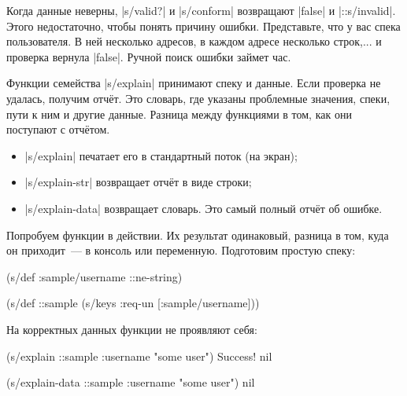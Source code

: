 \label{spec-explain}

Когда данные неверны, \spverb|s/valid?| и \spverb|s/conform| возвращают
\spverb|false| и \spverb|::s/invalid|. Этого недостаточно, чтобы понять причину
ошибки. Представьте, что у вас спека пользователя. В ней несколько адресов, в
каждом адресе несколько строк,... и проверка вернула \spverb|false|. Ручной
поиск ошибки займет час.

Функции семейства \spverb|s/explain| принимают спеку и данные. Если проверка не
удалась, получим отч\"{е}т. Это словарь, где указаны проблемные значения, спеки,
пути к ним и другие данные. Разница между функциями в том, как они поступают с
отч\"{е}том.

\begin{itemize}


\item
  \spverb|s/explain| печатает его в стандартный поток (на экран);

\item
  \spverb|s/explain-str| возвращает отч\"{е}т в виде строки;

\item
  \spverb|s/explain-data| возвращает словарь. Это самый полный отч\"{е}т об ошибке.

\end{itemize}

Попробуем функции в действии. Их результат одинаковый, разница в том, куда он
приходит~--- в консоль или переменную. Подготовим простую спеку:

\begin{english}
  \begin{clojure}
(s/def :sample/username ::ne-string)

(s/def ::sample
  (s/keys :req-un [:sample/username]))
  \end{clojure}
\end{english}

\noindent
На корректных данных функции не проявляют себя:

\begin{english}
  \begin{clojure}
(s/explain ::sample {:username "some user"})
Success!
nil

(s/explain-data ::sample {:username "some user"})
nil
  \end{clojure}
\end{english}

